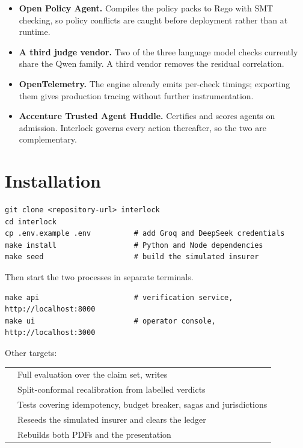 \documentclass[10pt]{article}
\begin{document}
\begin{itemize}
\item \textbf{Open Policy Agent.} Compiles the policy packs to Rego with SMT checking, so policy conflicts are caught before deployment rather than at runtime.
\item \textbf{A third judge vendor.} Two of the three language model checks currently share the Qwen family. A third vendor removes the residual correlation.
\item \textbf{OpenTelemetry.} The engine already emits per-check timings; exporting them gives production tracing without further instrumentation.
\item \textbf{Accenture Trusted Agent Huddle.} Certifies and scores agents on admission. Interlock governs every action thereafter, so the two are complementary.
\end{itemize}

\section{Installation}

\begin{Verbatim}[fontsize=\scriptsize, xleftmargin=6pt]
git clone <repository-url> interlock
cd interlock
cp .env.example .env          # add Groq and DeepSeek credentials
make install                  # Python and Node dependencies
make seed                     # build the simulated insurer
\end{Verbatim}

Then start the two processes in separate terminals.

\begin{Verbatim}[fontsize=\scriptsize, xleftmargin=6pt]
make api                      # verification service, http://localhost:8000
make ui                       # operator console,      http://localhost:3000
\end{Verbatim}

Other targets:

\vspace{2pt}
{\small
\begin{xltabular}{\textwidth}{@{}L{0.24\textwidth}Y@{}}
\toprule
{} &  \\
\midrule
{} & Full evaluation over the claim set, writes  \\
 & Split-conformal recalibration from labelled verdicts \\
 & Tests covering idempotency, budget breaker, sagas and jurisdictions \\
 & Reseeds the simulated insurer and clears the ledger \\
 & Rebuilds both PDFs and the presentation \\
\bottomrule
\end{xltabular}}
\end{document}
